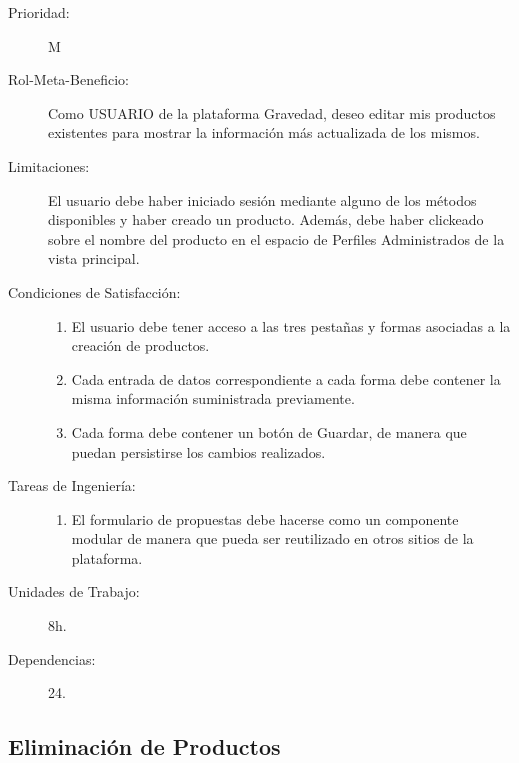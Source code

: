 \begin{description}
    \item[Prioridad:] M
    \item[Rol-Meta-Beneficio:] Como USUARIO de la plataforma Gravedad, deseo editar mis productos existentes para mostrar la información más actualizada de los mismos.
    \item[Limitaciones:] El usuario debe haber iniciado sesión mediante alguno de los métodos disponibles y haber creado un producto. Además, debe haber clickeado sobre el nombre del producto en el espacio de Perfiles Administrados de la vista principal.
    \item[Condiciones de Satisfacción:]  \hfill
        \begin{enumerate}
            \item El usuario debe tener acceso a las tres pestañas y formas asociadas a la creación de productos.
		    \item Cada entrada de datos correspondiente a cada forma debe contener la misma información suministrada previamente.
		    \item Cada forma debe contener un botón de Guardar, de manera que puedan persistirse los cambios realizados.
        \end{enumerate}
    \item[Tareas de Ingeniería:]  \hfill
        \begin{enumerate}
            \item El formulario de propuestas debe hacerse como un componente modular de manera que pueda ser reutilizado en otros sitios de la plataforma.
        \end{enumerate}
    \item[Unidades de Trabajo:] 8h.
    \item[Dependencias:] 24.
\end{description}

\newpage


\subsection{Eliminación de Productos}

